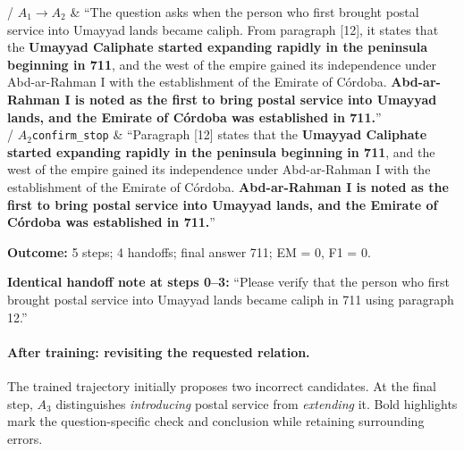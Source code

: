 \begin{longtable}
 / $A_1$\newline $\to A_2$ & ``The question asks when the person who first brought postal service into Umayyad lands became caliph. From paragraph [12], it states that the \textcolor{caseTranscriptEmphasis}{\textbf{Umayyad Caliphate started expanding rapidly in the peninsula beginning in 711}}, and the west of the empire gained its independence under Abd-ar-Rahman I with the establishment of the Emirate of C\'ordoba. \textcolor{caseTranscriptEmphasis}{\textbf{Abd-ar-Rahman I is noted as the first to bring postal service into Umayyad lands, and the Emirate of C\'ordoba was established in 711.}}'' \\
 / $A_2$\newline \texttt{confirm\_stop} & ``Paragraph [12] states that the \textcolor{caseTranscriptEmphasis}{\textbf{Umayyad Caliphate started expanding rapidly in the peninsula beginning in 711}}, and the west of the empire gained its independence under Abd-ar-Rahman I with the establishment of the Emirate of C\'ordoba. \textcolor{caseTranscriptEmphasis}{\textbf{Abd-ar-Rahman I is noted as the first to bring postal service into Umayyad lands, and the Emirate of C\'ordoba was established in 711.}}'' \\
\end{longtable}
\noindent\textbf{Outcome:} 5 steps; 4 handoffs; final answer 711; EM = 0, F1 = 0.
\par\endgroup

\noindent\small\textbf{Identical handoff note at steps 0--3:} ``Please verify that the person who first brought postal service into Umayyad lands became caliph in 711 using paragraph 12.''\par\normalsize

\paragraph{After training: revisiting the requested relation.}
The trained trajectory initially proposes two incorrect candidates. At the final step, $A_3$ distinguishes \emph{introducing} postal service from \emph{extending} it. Bold highlights mark the question-specific check and conclusion while retaining surrounding errors.

